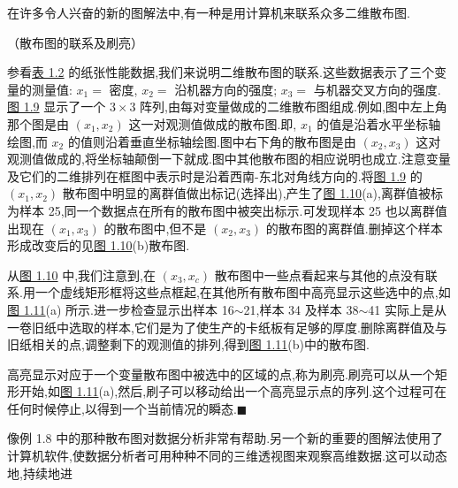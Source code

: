 

在许多令人兴奋的新的图解法中,有一种是用计算机来联系众多二维散布图.

\quad（散布图的联系及刷亮）

参看\hyperref[tab:1.2]{表 1.2} 的纸张性能数据,我们来说明二维散布图的联系.这些数据表示了三个变量的测量值: $x_1=$ 密度, $x_2=$ 沿机器方向的强度; $x_3=$ 与机器交叉方向的强度.\hyperref[fig:1.9]{图 1.9} 显示了一个 $3\times3$ 阵列,由每对变量做成的二维散布图组成.例如,图中左上角那个图是由 $(x_1, x_2)$ 这一对观测值做成的散布图.即, $x_1$ 的值是沿着水平坐标轴绘图,而 $x_2$ 的值则沿着垂直坐标轴绘图.图中右下角的散布图是由 $(x_2, x_3)$ 这对观测值做成的,将坐标轴颠倒一下就成.图中其他散布图的相应说明也成立.注意变量及它们的二维排列在框图中表示时是沿着西南-东北对角线方向的.将\hyperref[fig:1.9]{图 1.9} 的 $(x_1, x_2)$ 散布图中明显的离群值做出标记(选择出),产生了\hyperref[fig:1.10]{图 1.10}(a),离群值被标为样本 25,同一个数据点在所有的散布图中被突出标示.可发现样本 25 也以离群值出现在 $(x_1, x_3)$ 的散布图中,但不是 $(x_2, x_3)$ 的散布图的离群值.删掉这个样本形成改变后的见\hyperref[fig:1.10]{图 1.10}(b)散布图.

\begin{mvfigure}
\label{fig:1.9}
\end{mvfigure}

从\hyperref[fig:1.10]{图 1.10} 中,我们注意到,在 $(x_3, x_c)$ 散布图中一些点看起来与其他的点没有联系.用一个虚线矩形框将这些点框起,在其他所有散布图中高亮显示这些选中的点,如\hyperref[fig:1.11]{图 1.11}(a) 所示.进一步检查显示出样本 16$\sim$21,样本 34 及样本 38$\sim$41 实际上是从一卷旧纸中选取的样本,它们是为了使生产的卡纸板有足够的厚度.删除离群值及与旧纸相关的点,调整剩下的观测值的排列,得到\hyperref[fig:1.11]{图 1.11}(b)中的散布图.

高亮显示对应于一个变量散布图中被选中的区域的点,称为刷亮.刷亮可以从一个矩形开始,如\hyperref[fig:1.11]{图 1.11}(a),然后,刷子可以移动给出一个高亮显示点的序列.这个过程可在任何时候停止,以得到一个当前情况的瞬态.\quad$\blacksquare$

像例 1.8 中的那种散布图对数据分析非常有帮助.另一个新的重要的图解法使用了计算机软件,使数据分析者可用种种不同的三维透视图来观察高维数据.这可以动态地,持续地进%
